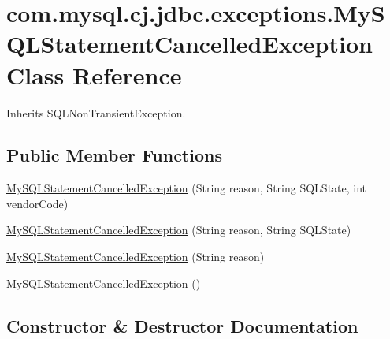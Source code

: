 \hypertarget{classcom_1_1mysql_1_1cj_1_1jdbc_1_1exceptions_1_1_my_s_q_l_statement_cancelled_exception}{}\section{com.\+mysql.\+cj.\+jdbc.\+exceptions.\+My\+S\+Q\+L\+Statement\+Cancelled\+Exception Class Reference}
\label{classcom_1_1mysql_1_1cj_1_1jdbc_1_1exceptions_1_1_my_s_q_l_statement_cancelled_exception}


Inherits S\+Q\+L\+Non\+Transient\+Exception.

\subsection*{Public Member Functions}
\begin{DoxyCompactItemize}
\item 
\mbox{\hyperlink{classcom_1_1mysql_1_1cj_1_1jdbc_1_1exceptions_1_1_my_s_q_l_statement_cancelled_exception_a7e54f5f18f5fefbb5d56d52ff368ef86}{My\+S\+Q\+L\+Statement\+Cancelled\+Exception}} (String reason, String S\+Q\+L\+State, int vendor\+Code)
\item 
\mbox{\hyperlink{classcom_1_1mysql_1_1cj_1_1jdbc_1_1exceptions_1_1_my_s_q_l_statement_cancelled_exception_a1b415e43f94b919095c369802fb12b54}{My\+S\+Q\+L\+Statement\+Cancelled\+Exception}} (String reason, String S\+Q\+L\+State)
\item 
\mbox{\hyperlink{classcom_1_1mysql_1_1cj_1_1jdbc_1_1exceptions_1_1_my_s_q_l_statement_cancelled_exception_a12ddd2c391ce0fe6a96e37ce7db2ca6b}{My\+S\+Q\+L\+Statement\+Cancelled\+Exception}} (String reason)
\item 
\mbox{\hyperlink{classcom_1_1mysql_1_1cj_1_1jdbc_1_1exceptions_1_1_my_s_q_l_statement_cancelled_exception_a4fef928bd335b5d6a67844d8323655bd}{My\+S\+Q\+L\+Statement\+Cancelled\+Exception}} ()
\end{DoxyCompactItemize}


\subsection{Constructor \& Destructor Documentation}
\mbox{\label{classcom_1_1mysql_1_1cj_1_1jdbc_1_1exceptions_1_1_my_s_q_l_statement_cancelled_exception_a7e54f5f18f5fefbb5d56d52ff368ef86}} 
